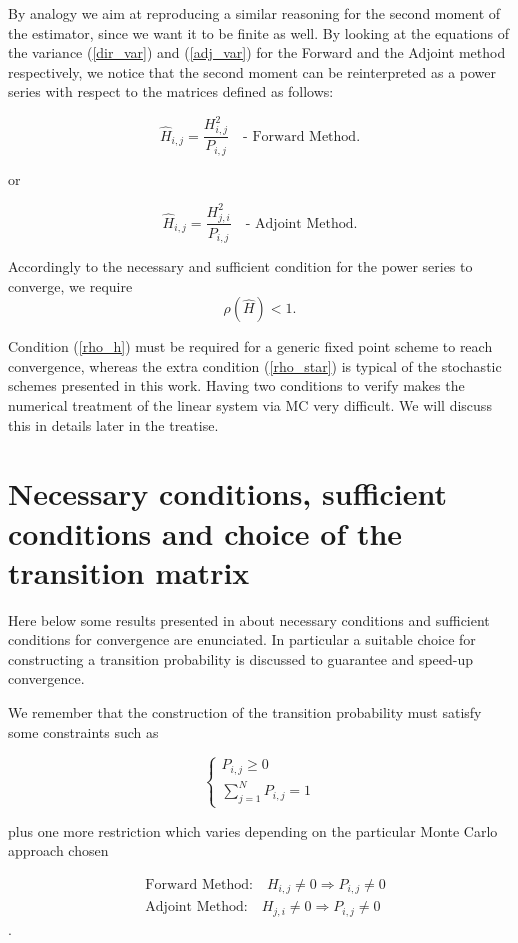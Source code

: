 \documentclass[a4paper,10pt]{article}
\begin{document}
By analogy we aim at reproducing a similar reasoning for the second moment of 
the estimator, since we want it to be finite as well. 
By looking at the equations of the variance (\ref{dir_var}) and (\ref{adj_var}) 
for 
the Forward and the Adjoint method respectively, we notice that the second 
moment can be reinterpreted as a power series with respect to the matrices
defined as follows:

\[
 \hat{H}_{i,j}=\frac{H_{i,j}^2}{P_{i,j}} \quad \text{- Forward Method}.
\]

or 

\[
 \hat{H}_{i,j}=\frac{H_{j,i}^2}{P_{i,j}} \quad \text{- Adjoint Method}.
\]


Accordingly to the necessary and sufficient condition for the power series to 
converge, we require 
\begin{equation}
 \rho(\hat{H})<1.
 \label{rho_star}
\end{equation}

Condition (\ref{rho_h}) must be required for a generic fixed point scheme to 
reach convergence, whereas the extra condition (\ref{rho_star}) is typical of 
the stochastic schemes presented in this work. Having two conditions to 
verify makes the numerical treatment of the linear system via MC very 
difficult. We will discuss this in details later in the treatise. \newline


\section{Necessary conditions, sufficient conditions and choice of the 
transition matrix}

Here below some results presented in 
\cite{MASC2013} about necessary conditions and sufficient 
conditions for 
convergence are enunciated. In particular a suitable choice for constructing a 
transition probability is discussed to guarantee and speed-up convergence. 

We remember that the construction of the transition probability must satisfy 
some constraints such as

\[
\begin{cases}
  P_{i,j}\ge 0 \\
 \sum_{j=1}^N P_{i,j}=1
\end{cases}
\] 
 
plus one more restriction which varies depending on the particular Monte Carlo 
approach chosen

\begin{align*}
& \text{Forward Method:} \quad H_{i,j}\ne 0 \Rightarrow P_{i,j}\ne 0 \\ &
\text{Adjoint Method:} \quad H_{j,i}\ne 0 \Rightarrow P_{i,j}\ne 0 
\end{align*}.
\end{document}
